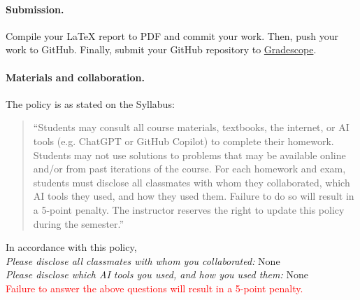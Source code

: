 \documentclass[11pt,letterpaper,english,oneside]{article} %
\theoremstyle{definition} %
\begin{document}
\paragraph{Submission.} Compile your LaTeX report to PDF and commit your work. Then, push your work to GitHub. Finally, submit your GitHub repository to \href{https://www.gradescope.com/courses/589902}{Gradescope}.

\paragraph{Materials and collaboration.} The policy is as stated on the Syllabus:

\begin{quote}
``Students may consult all course materials, textbooks, the internet, or AI tools (e.g. ChatGPT or GitHub Copilot) to complete their homework. Students may not use solutions to problems that may be available online and/or from past iterations of the course. For each homework and exam, students must disclose all classmates with whom they collaborated, which AI tools they used, and how they used them. Failure to do so will result in a 5-point penalty. The instructor reserves the right to update this policy during the semester.''
\end{quote}

\noindent In accordance with this policy, \\

\noindent \textit{Please disclose all classmates with whom you collaborated:} None\\

\noindent \textit{Please disclose which AI tools you used, and how you used them:} None \\

\noindent \textcolor{red}{Failure to answer the above questions will result in a 5-point penalty.}

\clearpage
\end{document}
